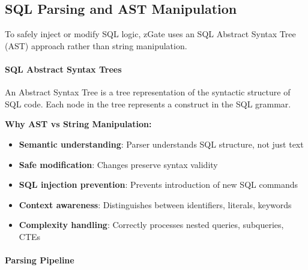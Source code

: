 \subsection{SQL Parsing and AST Manipulation}

To safely inject or modify SQL logic, zGate uses an SQL Abstract Syntax Tree (AST) approach rather than string manipulation.

\paragraph{SQL Abstract Syntax Trees}

An Abstract Syntax Tree is a tree representation of the syntactic structure of SQL code. Each node in the tree represents a construct in the SQL grammar.

\textbf{Why AST vs String Manipulation:}
\begin{itemize}
    \item \textbf{Semantic understanding}: Parser understands SQL structure, not just text
    \item \textbf{Safe modification}: Changes preserve syntax validity
    \item \textbf{SQL injection prevention}: Prevents introduction of new SQL commands
    \item \textbf{Context awareness}: Distinguishes between identifiers, literals, keywords
    \item \textbf{Complexity handling}: Correctly processes nested queries, subqueries, CTEs
\end{itemize}

\paragraph{Parsing Pipeline}

